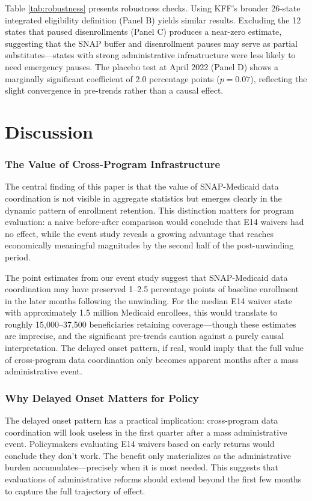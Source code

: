 \documentclass[12pt]{article}
\begin{document}
Table \ref{tab:robustness} presents robustness checks. Using KFF's broader 26-state integrated eligibility definition (Panel B) yields similar results. Excluding the 12 states that paused disenrollments (Panel C) produces a near-zero estimate, suggesting that the SNAP buffer and disenrollment pauses may serve as partial substitutes---states with strong administrative infrastructure were less likely to need emergency pauses. The placebo test at April 2022 (Panel D) shows a marginally significant coefficient of 2.0 percentage points ($p = 0.07$), reflecting the slight convergence in pre-trends rather than a causal effect.

\section{Discussion}

\subsubsection*{The Value of Cross-Program Infrastructure} The central finding of this paper is that the value of SNAP-Medicaid data coordination is not visible in aggregate statistics but emerges clearly in the dynamic pattern of enrollment retention. This distinction matters for program evaluation: a naive before-after comparison would conclude that E14 waivers had no effect, while the event study reveals a growing advantage that reaches economically meaningful magnitudes by the second half of the post-unwinding period.

The point estimates from our event study suggest that SNAP-Medicaid data coordination may have preserved 1--2.5 percentage points of baseline enrollment in the later months following the unwinding. For the median E14 waiver state with approximately 1.5 million Medicaid enrollees, this would translate to roughly 15,000--37,500 beneficiaries retaining coverage---though these estimates are imprecise, and the significant pre-trends caution against a purely causal interpretation. The delayed onset pattern, if real, would imply that the full value of cross-program data coordination only becomes apparent months after a mass administrative event.

\subsubsection*{Why Delayed Onset Matters for Policy} The delayed onset pattern has a practical implication: cross-program data coordination will look useless in the first quarter after a mass administrative event. Policymakers evaluating E14 waivers based on early returns would conclude they don't work. The benefit only materializes as the administrative burden accumulates---precisely when it is most needed. This suggests that evaluations of administrative reforms should extend beyond the first few months to capture the full trajectory of effect.
\end{document}
